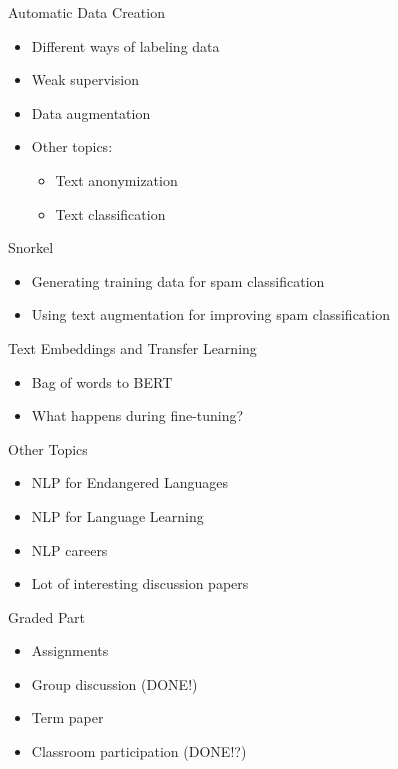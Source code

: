\documentclass{beamer}
\begin{document}
\begin{frame}{Automatic Data Creation}
    \begin{itemize}
        \item Different ways of labeling data
        \item Weak supervision
        \item Data augmentation
        \item Other topics:
        \begin{itemize}
            \item Text anonymization
            \item Text classification
        \end{itemize}
    \end{itemize}
\end{frame}

\begin{frame}{Snorkel}
    \begin{itemize}
        \item Generating training data for spam classification
        \item Using text augmentation for improving spam classification
    \end{itemize}
\end{frame}

\begin{frame}{Text Embeddings and Transfer Learning}
    \begin{itemize}
        \item Bag of words to BERT
        \item What happens during fine-tuning?
    \end{itemize}
\end{frame}

\begin{frame}{Other Topics}
    \begin{itemize}
        \item NLP for Endangered Languages
        \item NLP for Language Learning
        \item NLP careers
        \item Lot of interesting discussion papers
    \end{itemize}
\end{frame}

\begin{frame}{Graded Part}
\begin{itemize}
    \item Assignments
    \item Group discussion (DONE!)
    \item Term paper
    \item Classroom participation (DONE!?)
\end{itemize}    
\end{frame}
\end{document}

